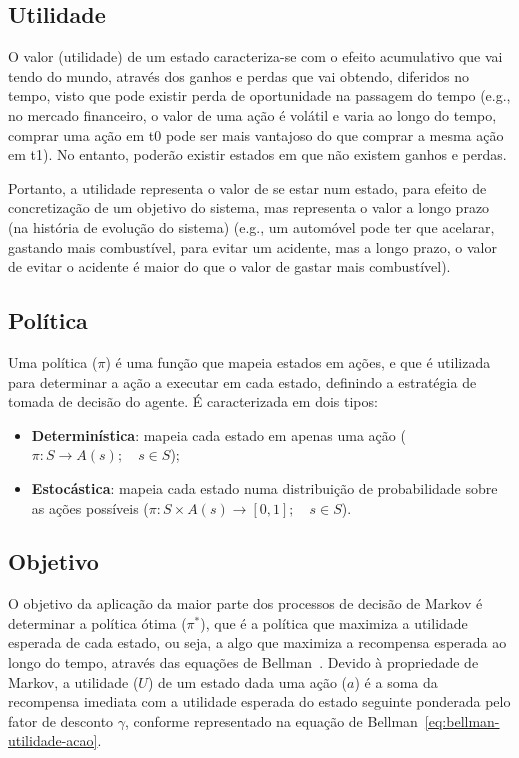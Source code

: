 \subsection{Utilidade}\label{subsec:utilidade}

O valor (utilidade) de um estado caracteriza-se com o efeito acumulativo que vai tendo do mundo, através dos ganhos e perdas que vai obtendo, diferidos no tempo, visto que pode existir perda de oportunidade na passagem do tempo (e.g., no mercado financeiro, o valor de uma ação é volátil e varia ao longo do tempo, comprar uma ação em t0 pode ser mais vantajoso do que comprar a mesma ação em t1).
No entanto, poderão existir estados em que não existem ganhos e perdas.

Portanto, a utilidade representa o valor de se estar num estado, para efeito de concretização de um objetivo do sistema, mas representa o valor a longo prazo (na história de evolução do sistema) (e.g., um automóvel pode ter que acelarar, gastando mais combustível, para evitar um acidente, mas a longo prazo, o valor de evitar o acidente é maior do que o valor de gastar mais combustível).

\subsection{Política}\label{subsec:politica-otima}

Uma política ($\pi$) é uma função que mapeia estados em ações, e que é utilizada para determinar a ação a executar em cada estado, definindo a estratégia de tomada de decisão do agente.
É caracterizada em dois tipos:

\begin{itemize}
    \item \textbf{Determinística}: mapeia cada estado em apenas uma ação ($\pi : S \rightarrow A(s); \quad s \in S$);
    \item \textbf{Estocástica}: mapeia cada estado numa distribuição de probabilidade sobre as ações possíveis ($\pi : S \times A(s) \rightarrow [0,1]; \quad s \in S$).
\end{itemize}

\subsection{Objetivo}\label{subsec:objetivo}

O objetivo da aplicação da maior parte dos processos de decisão de Markov é determinar a política ótima ($\pi^*$), que é a política que maximiza a utilidade esperada de cada estado, ou seja, a algo que maximiza a recompensa esperada ao longo do tempo, através das equações de Bellman~\cite{wiki:bellman-equation}.
Devido à propriedade de Markov, a utilidade ($U$) de um estado dada uma ação ($a$) é a soma da recompensa imediata com a utilidade esperada do estado seguinte ponderada pelo fator de desconto $\gamma$, conforme representado na equação de Bellman~\ref{eq:bellman-utilidade-acao}.

